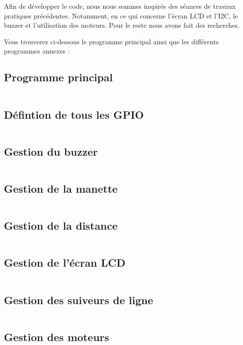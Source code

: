 Afin de développer le code, nous nous sommes inspirés des séances de travaux pratiques précédentes. Notamment, en ce qui concerne l'écran LCD et l'I2C, le buzzer et l'utilisation des moteurs. Pour le reste nous avons fait des recherches.

Vous trouverez ci-dessous le programme principal ainsi que les différents programmes annexes :

\subsection{Programme principal}
    \inputminted{c}{code/src/main.c}
\subsection{Défintion de tous les GPIO}
    \inputminted{c}{code/include/gpioPins.h}
\subsection{Gestion du buzzer}
    \inputminted{c}{code/src/buzzer.c}
\subsection{Gestion de la manette}
    \inputminted{c}{code/src/controller.c}
\subsection{Gestion de la distance}
    \inputminted{c}{code/src/distance.c}
\subsection{Gestion de l'écran LCD}
    \inputminted{c}{code/src/i2cLCD.c}
\subsection{Gestion des suiveurs de ligne}
    \inputminted{c}{code/src/lineFinder.c}
\subsection{Gestion des moteurs}
    \inputminted{c}{code/src/motors.c}

\newpage
